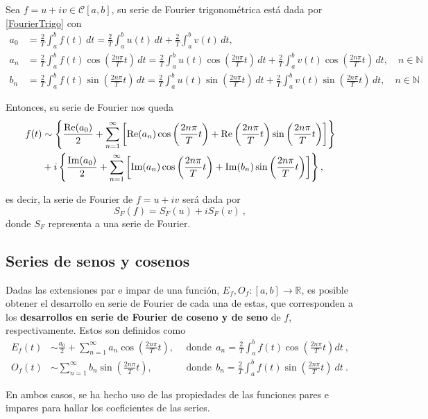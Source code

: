 Sea $f = u + iv \in \mathscr{C}[a,b]$, su serie de Fourier trigonométrica está dada por \eqref{FourierTrigo} con 
\begin{align*}
    a_0 &= \frac{2}{T} \int_{a}^{b} f(t) \,dt =  \frac{2}{T} \int_a^b u(t) \,dt + \frac{2}{T} \int_a^b v(t) \,dt,\\
    a_n &= \frac{2}{T} \int_a^b f(t) \cos\left( \frac{2n\pi}{T}t \right) \,dt = \frac{2}{T} \int_a^b u(t) \cos\left( \frac{2n\pi}{T}t \right) \,dt + \frac{2}{T} \int_a^b v(t) \cos\left( \frac{2n\pi}{T}t \right) \,dt , \quad n \in \mathbb{N} \\
    b_n &= \frac{2}{T} \int_a^b f(t) \sin\left( \frac{2n\pi}{T}t \right) \,dt = \frac{2}{T} \int_a^b u(t) \sin\left( \frac{2n\pi}{T}t \right) \,dt + \frac{2}{T} \int_a^b v(t) \sin\left( \frac{2n\pi}{T}t \right) \,dt, \quad n \in \mathbb{N}
\end{align*}

Entonces, su serie de Fourier nos queda
\begin{align}
  f(t) & \sim   \left\{ \frac{\operatorname{Re}(a_0)}{2} + \sum_{n=1}^{\infty} \left[ \operatorname{Re}(a_n) \cos\left( \frac{2n\pi}{T}t \right) + \operatorname{Re}\left( \frac{2n\pi}{T}t \right) \sin\left( \frac{2n\pi}{T}t \right) \right] \right\}  \nonumber \\
   &  + i \left\{ \frac{\operatorname{Im}(a_0)}{2} + \sum_{n=1}^{\infty} \left[\operatorname{Im}(a_n) \cos\left( \frac{2n\pi}{T}t \right) + \operatorname{Im}(b_n) \sin\left( \frac{2n\pi}{T}t \right) \right] \right\},
\end{align}

es decir, la serie de Fourier de $f = u + iv$ será dada por
\begin{equation}
    S_F(f) = S_F(u) + i S_F(v) \ ,
\end{equation}
donde $S_F$ representa a una serie de Fourier.


\subsection{Series de senos y cosenos}

\begin{defi} 
    Dadas las extensiones par e impar de una función, $E_f, O_f: [a,b] \to \mathbb{R}$, es posible obtener el desarrollo en serie de Fourier de cada una de estas, que corresponden a los \textbf{desarrollos en serie de Fourier de coseno y de seno} de $f$, respectivamente. Estos son definidos como
    \begin{align*}
        E_f(t) & \sim \frac{a_0}{2}  + \sum_{n=1}^{\infty} a_n \cos\left( \frac{2n\pi}{T}t \right), & ~~\mbox{donde}~~ a_n = \frac{2}{T} \int_a^{b} f(t) \cos\left( \frac{2n\pi}{T}t \right)  dt \ , \\
        O_f(t) & \sim  \sum_{n=1}^{\infty} b_n \sin\left( \frac{2n\pi}{T}t \right), & ~~\mbox{donde} ~~ b_n = \frac{2}{T} \int_a^{b} f(t) \sin\left( \frac{2n\pi}{T}t \right) \ dt \ .
    \end{align*}

    En ambos casos, se ha hecho uso de las propiedades de las funciones pares e impares para hallar los coeficientes de las series.
\end{defi}


